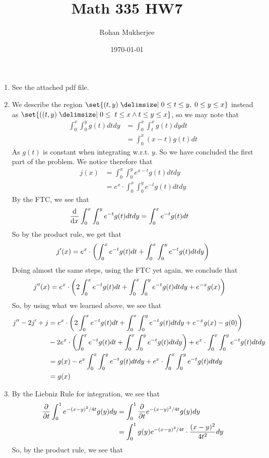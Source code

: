\documentclass[12pt]{article}
\title{Math 335 HW7}
\date{\today}
\author{Rohan Mukherjee}
\theoremstyle{definition}
\theoremstyle{remark}
\begin{document}
	\maketitle
	\begin{enumerate}[leftmargin=\labelsep]
		\item See the attached pdf file.
		\item We describe the region $\set{(t, y) \given 0 \leq t \leq y, \; 0 \leq y \leq x}$ instead as $\set{((t, y) \given 0 \leq \; t \leq x \land t \leq y \leq x}$, so we may note that
		\begin{align*}
			\int_0^x \int_0^y g(t)dtdy &= \int_0^x \int_t^x g(t)dydt \\
			&= \int_0^x (x-t)g(t)dt
		\end{align*}
		As $g(t)$ is constant when integrating w.r.t. $y$. So we have concluded the first part of the problem. We notice therefore that 
		\begin{align}
			j(x) &= \int_0^x \int_0^y e^{x-t}g(t)dtdy \\
			&= e^x \cdot \int_0^x \int_0^y e^{-t}g(t)dtdy
		\end{align}
		By the FTC, we see that
		\begin{align*}
			\dv{x} \int_0^x \int_0^y e^{-t}g(t)dtdy &= \int_0^x e^{-t}g(t)dt
		\end{align*}
		So by the product rule, we get that
		\begin{align*}
			j'(x) = e^x \cdot \qty(\int_0^x e^{-t}g(t)dt + \int_0^x \int_0^y e^{-t}g(t)dtdy)
		\end{align*}
		Doing almost the same steps, using the FTC yet again, we conclude that 
		\begin{align*}
			j''(x) &= e^x\cdot \qty(2\int_0^x e^{-t}g(t)dt + \int_0^x \int_0^y e^{-t}g(t)dtdy+e^{-x}g(x))
		\end{align*}
		So, by using what we learned above, we see that
		\begin{align*}
			j''-2j'+j&= e^x\cdot \qty(2\int_0^x e^{-t}g(t)dt + \int_0^x \int_0^y e^{-t}g(t)dtdy+e^{-x}g(x)-g(0)) \\
			&- 2e^x \cdot \qty(\int_0^x e^{-t}g(t)dt + \int_0^x \int_0^y e^{-t}g(t)dtdy) + e^x \cdot \int_0^x \int_0^y e^{-t}g(t)dtdy \\
			&= g(x) - e^x\int_0^x \int_0^y e^{-t}g(t)dtdy + e^x \cdot \int_0^x \int_0^y e^{-t}g(t)dtdy \\
			&= g(x)
		\end{align*}
		
		\item By the Liebniz Rule for integration, we see that
		\begin{align*}
			\pdv{t} \int_0^1 e^{-(x-y)^2/4t}g(y)dy &= \int_0^1 \pdv{t} e^{-(x-y)^2/4t}g(y)dy \\
			&= \int_0^1 g(y)e^{-(x-y)^2/4t} \cdot \frac{(x-y)^2}{4t^2}dy
		\end{align*}
		So, by the product rule, we see that
		

\end{enumerate}
\end{document}
